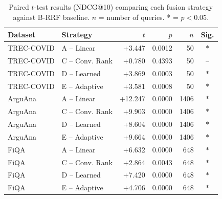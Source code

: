 \begin{table}[ht]
\centering
\small
\caption{Paired $t$-test results (NDCG@10) comparing each fusion strategy against B-RRF baseline. $n$ = number of queries. * = $p < 0.05$.}
\label{tab:significance}
\begin{tabular}{llrrrc}
\toprule
Dataset & Strategy & $t$ & $p$ & $n$ & Sig. \\
\midrule
TREC-COVID & A – Linear & +3.447 & 0.0012 & 50 & $*$ \\
TREC-COVID & C – Conv. Rank & +0.780 & 0.4393 & 50 & – \\
TREC-COVID & D – Learned & +3.869 & 0.0003 & 50 & $*$ \\
TREC-COVID & E – Adaptive & +3.581 & 0.0008 & 50 & $*$ \\
\midrule
ArguAna & A – Linear & +12.247 & 0.0000 & 1406 & $*$ \\
ArguAna & C – Conv. Rank & +9.903 & 0.0000 & 1406 & $*$ \\
ArguAna & D – Learned & +8.604 & 0.0000 & 1406 & $*$ \\
ArguAna & E – Adaptive & +9.664 & 0.0000 & 1406 & $*$ \\
\midrule
FiQA & A – Linear & +6.632 & 0.0000 & 648 & $*$ \\
FiQA & C – Conv. Rank & +2.864 & 0.0043 & 648 & $*$ \\
FiQA & D – Learned & +7.420 & 0.0000 & 648 & $*$ \\
FiQA & E – Adaptive & +4.706 & 0.0000 & 648 & $*$ \\
\bottomrule
\end{tabular}
\end{table}
